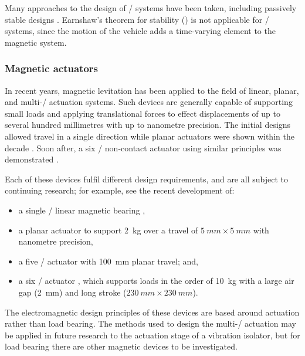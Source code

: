 \documentclass[11pt,a4paper]{memoir}
\begin{document}
Many approaches to the design of \maglev/ systems have been taken, including passively stable designs \cite{musolino2009,hasirci2011-ieps}.
Earnshaw's theorem for stability () is not applicable for \maglev/ systems, since the motion of the vehicle adds a time-varying element to the magnetic system.


\subsubsection{Magnetic actuators}

In recent years, magnetic levitation has been applied to the field of linear, planar, and multi-\dof/ actuation systems.
Such devices are generally capable of supporting small loads and applying translational forces to effect displacements of up to several hundred millimetres with up to nanometre precision.
The initial designs allowed travel in a single direction \parencite[\eg,][]{trumper1992} while planar actuators were shown within the decade \parencite[\eg,][]{kim1997-thesis,molenaar2000}.
Soon after, a six \dof/ non-contact actuator using similar principles was demonstrated \cite{verma2004}.

Each of these devices fulfil different design requirements, and are all subject to continuing research; for example, see the recent development of:
\begin{itemize}
\item a single \dof/ linear magnetic bearing \cite{ro2009-preeng},
\item a planar actuator \cite{kim2007} to support \SI{2}{kg} over a travel of $\SI{5}{mm}\times\SI{5}{mm}$ with nanometre precision,
\item a five \dof/ actuator \cite{fulford2009} with \SI{100}{mm} planar travel; and,
\item a six \dof/ actuator \cite{jansen2008}, which supports loads in the order of \SI{10}{kg} with a large air gap (\SI{2}{mm}) and long stroke ($\SI{230}{mm}\times\SI{230}{mm}$).
\end{itemize}
The electromagnetic design principles of these devices are based around actuation rather than load bearing.
The methods used to design the multi-\dof/ actuation may be applied in future research to the actuation stage of a vibration isolator, but
for load bearing there are other magnetic devices to be investigated.
\end{document}
